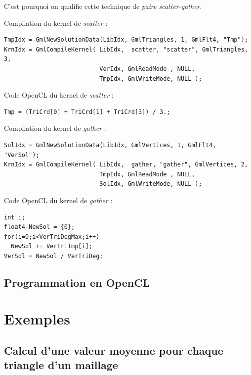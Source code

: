 \documentclass[a4paper,12pt]{article}
\begin{document}
C'est pourquoi on qualifie cette technique de \emph{paire scatter-gather}.

Compilation du kernel de \emph{scatter} :
\begin{tt}
\begin{verbatim}
TmpIdx = GmlNewSolutionData(LibIdx, GmlTriangles, 1, GmlFlt4, "Tmp");
KrnIdx = GmlCompileKernel( LibIdx,  scatter, "scatter", GmlTriangles, 3,
                           VerIdx, GmlReadMode , NULL,
                           TmpIdx, GmlWriteMode, NULL );
\end{verbatim}
\end{tt}
\normalfont

Code OpenCL du kernel de \emph{scatter} :
\begin{tt}
\begin{verbatim}
Tmp = (TriCrd[0] + TriCrd[1] + TriCrd[3]) / 3.;
\end{verbatim}
\end{tt}
\normalfont

Compilation du kernel de \emph{gather} :
\begin{tt}
\begin{verbatim}
SolIdx = GmlNewSolutionData(LibIdx, GmlVertices, 1, GmlFlt4, "VerSol");
KrnIdx = GmlCompileKernel( LibIdx,  gather, "gather", GmlVertices, 2,
                           TmpIdx, GmlReadMode , NULL,
                           SolIdx, GmlWriteMode, NULL );
\end{verbatim}
\end{tt}
\normalfont

Code OpenCL du kernel de \emph{gather} :
\begin{tt}
\begin{verbatim}
int i;
float4 NewSol = {0};
for(i=0;i<VerTriDegMax;i++)
  NewSol += VerTriTmp[i];
VerSol = NewSol / VerTriDeg;
\end{verbatim}
\end{tt}
\normalfont


\subsection{Programmation en OpenCL}


\section{Exemples}

\subsection{Calcul d'une valeur moyenne pour chaque triangle d'un maillage}
\end{document}
